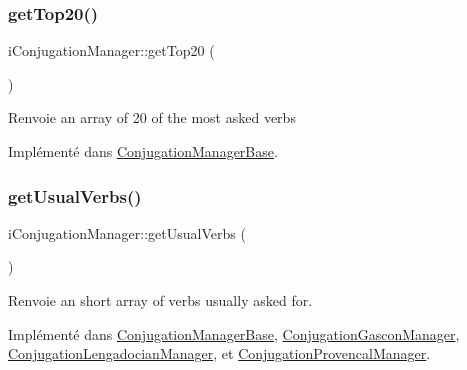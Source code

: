 \subsubsection{\texorpdfstring{get\+Top20()}{getTop20()}}
{\footnotesize\ttfamily i\+Conjugation\+Manager\+::get\+Top20 (\begin{DoxyParamCaption}{ }\end{DoxyParamCaption})}

\begin{DoxyReturn}{Renvoie}
an array of 20 of the most asked verbs 
\end{DoxyReturn}


Implémenté dans \hyperlink{classConjugationManagerBase_a63728ecfb3a2eb259accf59dd79e9c26}{Conjugation\+Manager\+Base}.

\hypertarget{interfaceiConjugationManager_a2a7ed39313c1c92ef5c01c88895de36e}{}\label{interfaceiConjugationManager_a2a7ed39313c1c92ef5c01c88895de36e} 
\subsubsection{\texorpdfstring{get\+Usual\+Verbs()}{getUsualVerbs()}}
{\footnotesize\ttfamily i\+Conjugation\+Manager\+::get\+Usual\+Verbs (\begin{DoxyParamCaption}{ }\end{DoxyParamCaption})}

\begin{DoxyReturn}{Renvoie}
an short array of verbs usually asked for. 
\end{DoxyReturn}


Implémenté dans \hyperlink{classConjugationManagerBase_a1dff05e951fe4453247a97f5aff5bc83}{Conjugation\+Manager\+Base}, \hyperlink{classConjugationGasconManager_a4117ecff48a5baa29d894f6174d88983}{Conjugation\+Gascon\+Manager}, \hyperlink{classConjugationLengadocianManager_a1ec18e3663eae35578b4f1967e4d981d}{Conjugation\+Lengadocian\+Manager}, et \hyperlink{classConjugationProvencalManager_ab54b1aaa7e39d3f31d416640322eae5a}{Conjugation\+Provencal\+Manager}.

\hypertarget{interfaceiConjugationManager_a1b56822fc7f5f7b7b9c0b0c406993b3c}{}\label{interfaceiConjugationManager_a1b56822fc7f5f7b7b9c0b0c406993b3c} 
